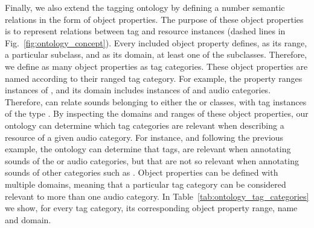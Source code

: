 Finally, we also extend the tagging ontology by defining a number semantic relations in the form of object properties.
The purpose of these object properties is to represent relations between tag and resource instances (dashed lines in Fig.~\ref{fig:ontology_concept}).
Every included object property defines, as its range, a particular  subclass, and as its domain, at least one of the  subclasses. Therefore, we define as many object properties as tag categories. These object properties are named according to their ranged tag category. 
For example, the property  ranges instances of , and its domain includes instances of  and  audio categories.
Therefore,  can relate sounds belonging to either the  or  classes, with tag instances of the type .
By inspecting the domains and ranges of these object properties, our ontology can determine which tag categories are relevant when describing a resource of a given audio category. 
For instance, and following the previous example, the ontology can determine that  tags, are relevant when annotating sounds of the  or  audio categories, but that are not so relevant when annotating sounds of other categories such as .
Object properties can be defined with multiple domains, meaning that a particular tag category can be considered relevant to more than one audio category.
In Table~\ref{tab:ontology_tag_categories} we show, for every tag category, its corresponding object property range, name and domain.


